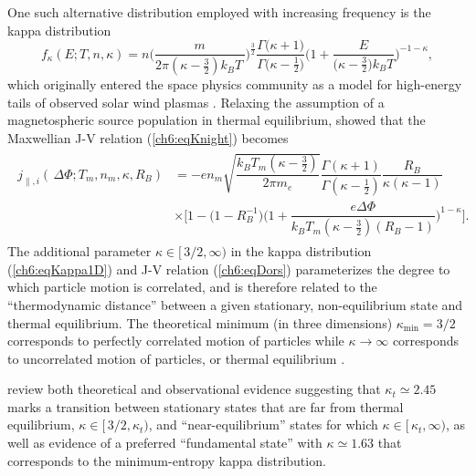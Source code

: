   One such alternative distribution employed with increasing frequency is the
  kappa distribution \citep{Livadiotis2013}
    \begin{equation} \label{ch6:eqKappa1D} f_{\kappa}(E; T, n, \kappa) = n \Bigg
      ( \dfrac{m}{2 \pi (\kappa - \frac{3}{2}) k_{B} T \, } \Bigg
      )^{\frac{3}{2}} \dfrac{\Gamma \big ( \kappa + 1 \big ) }{\Gamma \big (
        \kappa - \frac{1}{2} \big ) } \Bigg ( 1 + \dfrac{E}{ \big ( \kappa -
        \frac{3}{2} \big ) k_B T } \Bigg )^{-1 - \kappa},
    \end{equation}
   which originally entered the space physics community as a model for
   high-energy tails of observed solar wind plasmas
   \citep{Vasyliunas1968}. Relaxing the assumption of a magnetospheric source
   population in thermal equilibrium, \citet{Dors1999} showed that the
   Maxwellian J-V relation (\ref{ch6:eqKnight}) becomes
    \begin{align}
      \label{ch6:eqDors}
      \begin{array}{ll}
        j_{\parallel,i} ( \, \Delta \Phi ; T_m, n_m, \kappa, R_B ) &= - e n_m \sqrt{ \dfrac{ k_B T_m (\kappa -
            \frac{3}{2})}{ 2 \pi m_e}} \dfrac{\Gamma (\kappa + 1)}{\Gamma (\kappa - \frac{1}{2})} \dfrac{R_B}{\kappa (\kappa - 1)} \\
        &\times \Bigg[1 - \Big(1 - R_B^{-1} \Big) \Bigg(1+\dfrac{e \Delta \Phi}{ k_B
          T_m (\kappa - \frac{3}{2})(R_B - 1)} \Bigg)^{1-\kappa} \Bigg].
      \end{array}
    \end{align}
  The additional parameter $\kappa \in [ \, 3/2, \infty )$ in the kappa
  distribution (\ref{ch6:eqKappa1D}) and J-V relation (\ref{ch6:eqDors})
  parameterizes the degree to which particle motion is correlated, and is
  therefore related to the ``thermodynamic distance'' between a given
  stationary, non-equilibrium state and thermal equilibrium. The theoretical
  minimum (in three dimensions) $\kappa_{\textrm{min}} = 3/2$ corresponds to
  perfectly correlated motion of particles while $\kappa \rightarrow \infty$
  corresponds to uncorrelated motion of particles, or thermal equilibrium
  \citep{Livadiotis2010,Livadiotis2011,Livadiotis2013}.

  \citet{Livadiotis2010} review both theoretical and observational evidence
  suggesting that $\kappa_t \simeq 2.45$ marks a transition between stationary
  states that are far from thermal equilibrium, $\kappa \in [ \, 3/2, \kappa_t
  )$, and ``near-equilibrium'' states for which $\kappa \in [ \, \kappa_t,
  \infty )$, as well as evidence of a preferred ``fundamental state'' with
  $\kappa \simeq 1.63$ that corresponds to the minimum-entropy kappa
  distribution.

